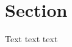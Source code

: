 \documentclass{article}
\begin{document}
\section{Section}
Text \cite{knuth_fa} text text

\printbibliography
\end{document}
